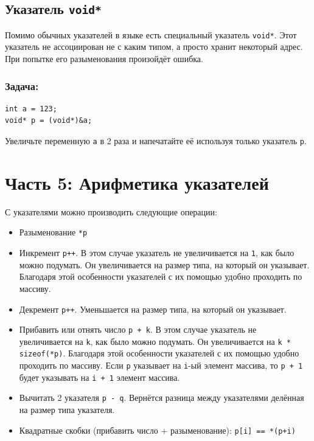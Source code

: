 \documentclass{article}
\begin{document}
\subsection*{Указатель \texttt{void*}}
Помимо обычных указателей в языке есть специальный указатель \texttt{void*}. Этот указатель не ассоциирован не с каким типом, а просто хранит некоторый адрес. При попытке его разыменования произойдёт ошибка.
\subsubsection*{Задача:}
\begin{lstlisting} 
int a = 123;
void* p = (void*)&a;
\end{lstlisting}
Увеличьте переменную \texttt{a} в 2 раза и напечатайте её используя только указатель \texttt{p}.


\newpage
\section*{Часть 5: Арифметика указателей}
С указателями можно производить следующие операции:
\begin{itemize}
\item Разыменование \texttt{*p}
\item Инкремент \texttt{p++}. В этом случае указатель не увеличивается на \texttt{1}, как было можно подумать. Он увеличивается на размер типа, на который он указывает. Благодаря этой особенности указателей с их помощью удобно проходить по массиву.
\item Декремент \texttt{p++}. Уменьшается на размер типа, на который он указывает.
\item Прибавить или отнять число \texttt{p + k}. В этом случае указатель не увеличивается на \texttt{k}, как было можно подумать. Он увеличивается на \texttt{k * sizeof(*p)}. Благодаря этой особенности указателей с их помощью удобно проходить по массиву. Если \texttt{p} указывает на \texttt{i}-ый элемент массива, то \texttt{p + 1} будет указывать на \texttt{i + 1} элемент массива.
\item Вычитать 2 указателя \texttt{p - q}. Вернётся разница между указателями делённая на размер типа указателя.
\item Квадратные скобки (прибавить число + разыменование): \quad \texttt{p[i] == *(p+i)}
\end{itemize}
\end{document}
